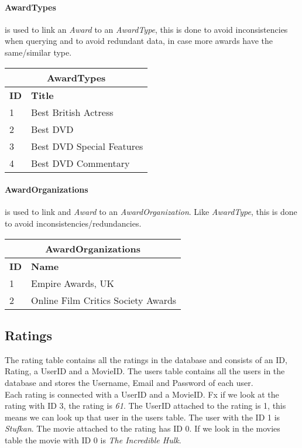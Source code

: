 \paragraph{AwardTypes} is used to link an \textit{Award} to an \textit{AwardType}, this is done to avoid inconsistencies when querying and to avoid redundant data, in case more awards have the same/similar type.

\begin{center}
\begin{tabular}{|l|l|}
\hline
\multicolumn{2}{|c|}{AwardTypes} \\ \hline \hline
\textbf{ID} & \textbf{Title} \\ \hline \hline
1 & Best British Actress \\ \hline
2 & Best DVD \\ \hline
3 & Best DVD Special Features \\ \hline
4 & Best DVD Commentary \\ \hline
\end{tabular}
\end{center}

\paragraph{AwardOrganizations} is used to link and \textit{Award} to an \textit{AwardOrganization}.
Like \textit{AwardType}, this is done to avoid inconsistencies/redundancies.

\begin{center}
\begin{tabular}{|l|l|}
\hline
\multicolumn{2}{|c|}{AwardOrganizations} \\ \hline \hline
\textbf{ID} & \textbf{Name} \\ \hline \hline
1 & Empire Awards, UK \\ \hline
2 & Online Film Critics Society Awards \\ \hline
\end{tabular}
\end{center}

\subsection{Ratings}
The rating table contains all the ratings in the database and consists of an ID, Rating, a UserID and a MovieID.
The users table contains all the users in the database and stores the Username, Email and Password of each user.\\
Each rating is connected with a UserID and a MovieID.
Fx if we look at the rating with ID 3, the rating is \textit{61}.
The UserID attached to the rating is 1, this means we can look up that user in the users table.
The user with the ID 1 is \textit{Stufkan}.
The movie attached to the rating has ID 0.
If we look in the movies table the movie with ID 0 is \textit{The Incredible Hulk}.
